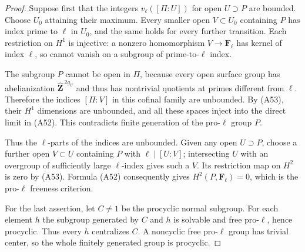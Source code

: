 \documentclass[11pt,oneside]{article}
\begin{document}
\begin{proof}
Suppose first that the integers
$v_\ell([\Pi:U])$ for open $U\supset P$
are bounded. Choose $U_0$ attaining their
maximum. Every smaller open $V\subset U_0$
containing $P$ has index prime to $\ell$ in
$U_0$, and the same holds for every further
transition. Each restriction on $H^1$ is
injective: a nonzero homomorphism
$V\to\mathbf F_\ell$ has kernel of index
$\ell$, so cannot vanish on a subgroup of
prime-to-$\ell$ index.

The subgroup $P$ cannot be open in $\Pi$,
because every open surface group has
abelianization $\widehat{\mathbf Z}^{\,2g_U}$
and thus has nontrivial quotients at primes
different from $\ell$. Therefore the indices
$[\Pi:V]$ in this cofinal family are unbounded.
By (A53), their $H^1$ dimensions are unbounded,
and all these spaces inject into the direct
limit in (A52). This contradicts finite
generation of the pro-$\ell$ group $P$.

Thus the $\ell$-parts of the indices are
unbounded. Given any open $U\supset P$, choose
a further open $V\subset U$ containing $P$
with $\ell\mid[U:V]$; intersecting $U$ with
an overgroup of sufficiently large
$\ell$-index gives such a $V$.
Its restriction map on $H^2$ is zero by
(A53). Formula (A52) consequently gives
$H^2(P,\mathbf F_\ell)=0$, which is the
pro-$\ell$ freeness criterion.

For the last assertion, let $C\ne1$ be the
procyclic normal subgroup. For each element
$h$ the subgroup generated by $C$ and $h$
is solvable and free pro-$\ell$, hence
procyclic. Thus every $h$ centralizes $C$.
A noncyclic free pro-$\ell$ group has trivial
center, so the whole finitely generated group
is procyclic.
\end{proof}
\end{document}

